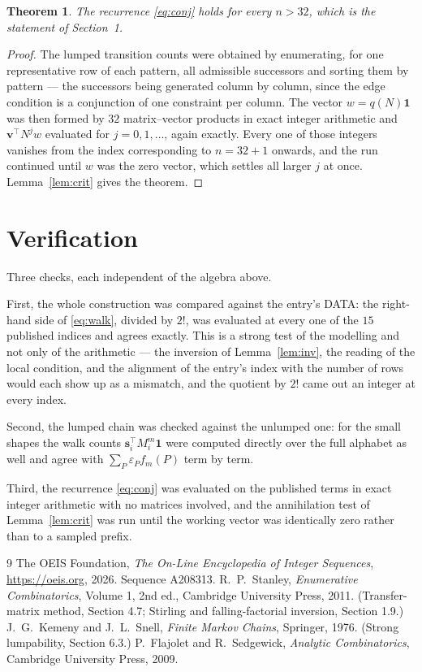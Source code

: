 \documentclass[11pt,a4paper]{article}
\theoremstyle{plain}
\newtheorem{theorem}{Theorem}
\theoremstyle{definition}
\begin{document}
\begin{theorem}
The recurrence \eqref{eq:conj} holds for every $n>32$, which is the statement of
Section~1.
\end{theorem}

\begin{proof}
The lumped transition counts were obtained by enumerating, for one representative row of
each pattern, all admissible successors and sorting them by pattern --- the successors being
generated column by column, since the edge condition is a conjunction of one constraint per
column. The vector $w=q(N)\mathbf{1}$ was then formed by $32$ matrix--vector products
in exact integer arithmetic and $\mathbf{v}^{\!\top}N^{j}w$ evaluated for
$j=0,1,\dots$, again exactly. Every one of those integers vanishes from the index
corresponding to $n=32+1$ onwards, and the run continued until $w$ was the zero vector,
which settles all larger $j$ at once. Lemma~\ref{lem:crit} gives the theorem.
\end{proof}

\section{Verification}

Three checks, each independent of the algebra above.

First, the whole construction was compared against the entry's DATA: the right-hand side of
\eqref{eq:walk}, divided by $2!$, was evaluated at every one of the $15$
published indices and agrees exactly. This is a strong test of the modelling and not only of
the arithmetic --- the inversion of Lemma~\ref{lem:inv}, the reading of the local
condition, and the alignment of the entry's index with the number of rows would each
show up as a mismatch, and the quotient by $2!$ came out an integer at every index.

Second, the lumped chain was checked against the unlumped one: for the small shapes the walk
counts $\mathbf{s}_i^{\!\top}M_i^{m}\mathbf{1}$ were computed directly over the full
alphabet as well and agree with $\sum_P\varepsilon_Pf_m(P)$ term by term.

Third, the recurrence \eqref{eq:conj} was evaluated on the published terms in exact integer
arithmetic with no matrices involved, and the annihilation test of Lemma~\ref{lem:crit} was
run until the working vector was identically zero rather than to a sampled prefix.

\begin{thebibliography}{9}
 The OEIS Foundation, \emph{The On-Line Encyclopedia of Integer
Sequences}, \url{https://oeis.org}, 2026. Sequence A208313.
 R.~P.~Stanley, \emph{Enumerative Combinatorics}, Volume 1, 2nd ed.,
Cambridge University Press, 2011. (Transfer-matrix method, Section 4.7; Stirling and
falling-factorial inversion, Section 1.9.)
 J.~G.~Kemeny and J.~L.~Snell, \emph{Finite Markov Chains}, Springer,
1976. (Strong lumpability, Section 6.3.)
 P.~Flajolet and R.~Sedgewick, \emph{Analytic Combinatorics}, Cambridge
University Press, 2009.
\end{thebibliography}
\end{document}
